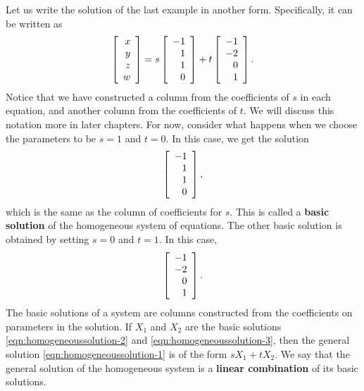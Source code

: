 Let us write the solution of the last example in another form.
Specifically, it can be written as 
\begin{equation}\label{eqn:homogeneoussolution-1}
  \left[
  \begin{array}{r}
    x\\
    y\\
    z\\
    w
  \end{array}
  \right]
  =
  s
  \left[
  \begin{array}{r}
    -1\\
    1\\
    1\\
    0
  \end{array}
  \right]
  +
  t
  \left[
  \begin{array}{r}
    -1\\
    -2\\
    0\\
    1
  \end{array}
  \right].
\end{equation}
Notice that we have constructed a column from the coefficients of $s$
in each equation, and another column from the coefficients of $t$.  We
will discuss this notation more in later chapters. For now, consider
what happens when we choose the parameters to be $s=1$ and $t=0$. In
this case, we get the solution
\begin{equation}\label{eqn:homogeneoussolution-2}
  \left[
  \begin{array}{r}
    -1\\
    1\\
    1\\
    0
  \end{array}
  \right],
\end{equation}
which is the same as the column of coefficients for $s$. This is
called a \textbf{basic solution} of the
homogeneous system of equations. The other basic solution is obtained
by setting $s=0$ and $t=1$. In this case,
\begin{equation}\label{eqn:homogeneoussolution-3}
  \left[
  \begin{array}{r}
    -1\\
    -2\\
    0\\
    1
  \end{array}
  \right].
\end{equation}
The basic solutions of a system are columns constructed from the
coefficients on parameters in the solution. If $X_1$ and $X_2$ are the
basic solutions {\eqref{eqn:homogeneoussolution-2}} and
{\eqref{eqn:homogeneoussolution-3}}, then the general solution
{\eqref{eqn:homogeneoussolution-1}} is of the form $sX_1+tX_2$.  We
say that the general solution of the homogeneous system is a
\textbf{linear combination} of its basic solutions.

